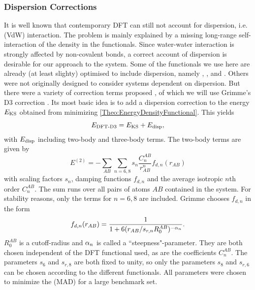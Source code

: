 \documentclass[8.5pt,twoside,twocolumn]{article}
\theoremstyle{standard}
\begin{document}
\subsubsection{Dispersion Corrections}

It is well known that contemporary DFT can still not account for dispersion, i.e.  (VdW)
interaction. 
The problem is mainly explained by a missing long-range self-interaction
of the density \cite{Kryachko} in the functionals.
Since water-water interaction is strongly affected by non-covalent bonds, a correct
account of dispersion is desirable for our approach to the system. Some of the functionals
we use here are already (at least slighty) optimised to include dispersion, namely
\pbez, \tpss, {\tpssh} and \bns. Others were not originally designed to
consider systems dependent on dispersion. But there were a variety of correction
terms proposed \cite{BeckeXDM2007}\cite{GrimmeDCorrection2010}, of which we will use
Grimme's D3 correction \cite{GrimmeD32011}. Its most basic idea is to add a dispersion
correction to the energy $E_{\text{KS}}$ obtained from minimizing \eqref{Theo:EnergyDensityFunctional}.
This yields
\begin{equation}
E_{\text{DFT-D3}}=E_{\text{KS}}+E_{\text{disp}},
\end{equation}  
with $E_{\text{disp}}$ including two-body and three-body terms. The two-body terms
are given by
\begin{equation}
E^{(2)}=-\sum_{AB}\sum_{n=6,8} s_n \frac {C_n^{AB}}{r_{AB}^n} f_{d,n}(r_{AB})
\end{equation}
with scaling factors $s_n$, damping functions $f_{d,n}$ and the average isotropic
$n$th order  $C_n^{AB}$. The sum runs over
all pairs of atoms $AB$ contained in the system. For stability reasons, only the terms
for $n=6,8$ are included. 
Grimme chooses $f_{d,n}$ in the form
\begin{equation}
f_{d,n}(r_{AB})=\frac 1 {1+6(r_{AB}/s_{r,n}R_0^{AB})^{-\alpha_n}}.
\end{equation}
$R_0^{AB}$ is a cutoff-radius and $\alpha_n$ is called a ``steepness"-parameter. They are both
chosen independent of the DFT functional used, as are the coefficients $C_n^{AB}$. The
parameters $s_6$ and $s_{r,8}$ are both fixed to unity, so only the parameters
$s_8$ and $s_{r,6}$ can be chosen according to the different functionals. All
parameters were chosen to minimize the  (MAD) for
a large benchmark set.
\end{document}
